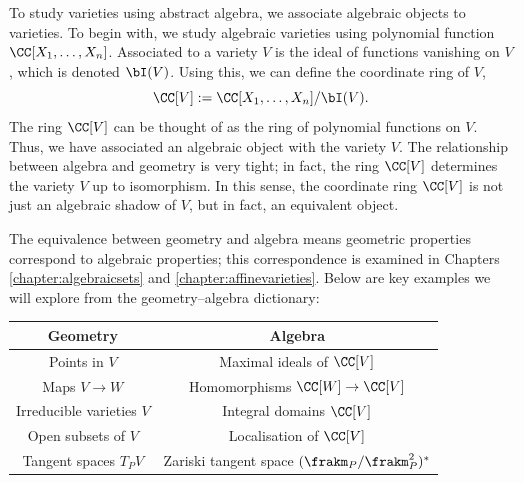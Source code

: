 \documentclass[12pt]{amsart}
\theoremstyle{plain}
\theoremstyle{definition}
\begin{document}
To study varieties using abstract algebra, we associate algebraic objects to varieties.
To begin with, we study algebraic varieties using polynomial function $\CC[X_1, \ldots, X_n]$.
Associated to a variety $V$ is the ideal of functions vanishing on $V$, which is denoted $\bI(V)$.
Using this, we can define the coordinate ring of $V$, 
$$\CC[V] := \CC[X_1, \ldots, X_n] / \bI(V).$$
The ring $\CC[V]$ can be thought of as the ring of polynomial functions on $V$.
Thus, we have associated an algebraic object with the variety $V$.
The relationship between algebra and geometry is very tight;
in fact, the ring $\CC[V]$ determines the variety $V$ up to isomorphism.
In this sense, the coordinate ring $\CC[V]$ is not just an algebraic shadow of $V$, but in fact, an equivalent object.

The equivalence between geometry and algebra means geometric properties correspond to algebraic properties;
this correspondence is examined in Chapters \ref{chapter:algebraicsets} and \ref{chapter:affinevarieties}.
Below are key examples we will explore from the geometry--algebra dictionary:
\begin{center}
\begin{tabular}{c | c}
	Geometry & Algebra \\
	\hline
	Points in $V$ & Maximal ideals of $\CC[V]$ \\
	Maps $V \to W$ & Homomorphisms $\CC[W] \to \CC[V]$ \\
	Irreducible varieties $V$ & Integral domains $\CC[V]$ \\
	Open subsets of $V$ & Localisation of $\CC[V]$ \\
	Tangent spaces $T_PV$ &  Zariski tangent space $(\frakm_P / \frakm_P^2)^*$
\end{tabular}
\end{center}
\end{document}
